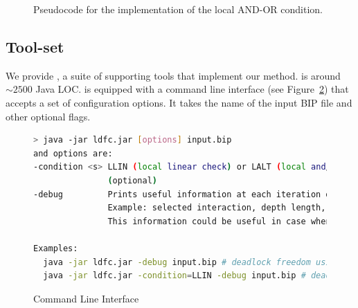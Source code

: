 \begin{figure}
\begin{tabbing}
%


\end{tabbing}

\caption{Pseudocode for the implementation of the local AND-OR condition.}
\label{fig:impl.locANDOR}
\end{figure}







   \subsection{Tool-set}
   \label{s:tools}
%   


%
We provide \deadlocktool{}, a suite of supporting tools that implement our method. \deadlocktool{} is around $\sim 2500$ Java LOC.
%
\deadlocktool{} is equipped with a command line interface (see Figure~\ref{code:cmd-ldfc}) that accepts a set 
of configuration options. 
It takes the name of the input BIP file and other optional flags. 

\begin{figure}
\begin{lstlisting}[language=Bash]
> java -jar ldfc.jar [options] input.bip 
and options are:
-condition <s> LLIN (local linear check) or LALT (local and/or check - default)
               (optional)
-debug         Prints useful information at each iteration of checking. 
               Example: selected interaction, depth length, etc.
               This information could be useful in case when the condition fails.

Examples:
  java -jar ldfc.jar -debug input.bip # deadlock freedom using default LALT
  java -jar ldfc.jar -condition=LLIN -debug input.bip # deadlock freedom using LLIN
\end{lstlisting}
\caption{\deadlocktool{} Command Line Interface}
\label{code:cmd-ldfc}
\end{figure}




